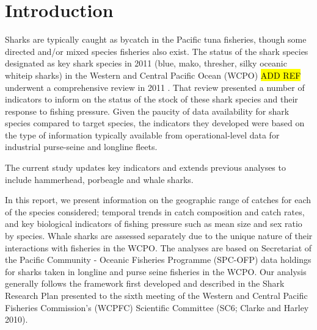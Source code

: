 \documentclass[12pt]{SCreport}
\begin{document}
\wcpfctitlepage

\tableofcontents


\section{Introduction} %


Sharks are typically caught as bycatch in the Pacific tuna fisheries, though some directed and/or mixed species fisheries also exist. The status of the shark species designated as key shark species in 2011 (blue, mako, thresher, silky oceanic whiteip  sharks) in the Western and Central Pacific Ocean (WCPO) \hl{ADD REF} underwent a comprehensive review in 2011 \citep{Clarke2011_a}. That review presented a number of indicators to inform on the status of the stock of these shark species and their response to fishing pressure. Given the paucity of data availability for shark species compared to target species, the indicators they developed were based on the type of information typically available from operational-level data for industrial purse-seine and longline fleets. 

The current study updates key indicators and extends previous analyses to include hammerhead, porbeagle and whale sharks.  

In this report, we present information on the geographic range of catches for each of the species considered; temporal trends in catch composition and catch rates, and key biological indicators of fishing pressure such as mean size and sex ratio by species. Whale sharks are assessed separately due to the unique nature of their interactions with fisheries in the WCPO. The analyses are based on Secretariat of the Pacific Community - Oceanic Fisheries Programme (SPC-OFP) data holdings for sharks taken in longline and purse seine fisheries in the WCPO.  Our analysis generally follows the framework first developed and described in the Shark Research Plan presented to the sixth meeting of the Western and Central Pacific Fisheries Commission's (WCPFC) Scientific Committee (SC6; Clarke and Harley 2010). 
\end{document}
